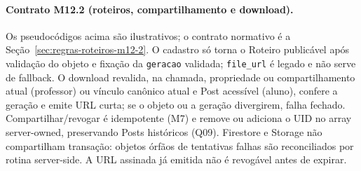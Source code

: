 \paragraph{Contrato M12.2 (roteiros, compartilhamento e download).}
Os pseudocódigos acima são ilustrativos; o contrato normativo é a
Seção~\ref{sec:regras-roteiros-m12-2}. O cadastro só torna o Roteiro publicável
após validação do objeto e fixação da \texttt{geracao} validada; \texttt{file\_url}
é legado e não serve de fallback. O download revalida, na chamada, propriedade
ou compartilhamento atual (professor) ou vínculo canônico atual e Post acessível
(aluno), confere a geração e emite URL curta; se o objeto ou a geração
divergirem, falha fechado. Compartilhar/revogar é idempotente (M7) e remove ou
adiciona o UID no array server-owned, preservando Posts históricos (Q09).
Firestore e Storage não compartilham transação: objetos órfãos de tentativas
falhas são reconciliados por rotina server-side. A URL assinada já emitida não
é revogável antes de expirar.
